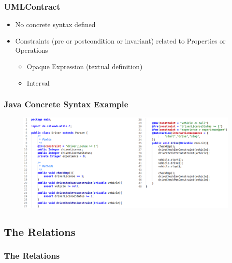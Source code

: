 \documentclass{beamer}
\begin{document}
\begin{frame}
	\frametitle{UMLContract}
	\begin{itemize}
		\item No concrete syntax defined
		\item Constraints (pre or postcondition or invariant) related to Properties or Operations
		\begin{itemize}
			\item Opaque Expression (textual definition)
			\item Interval
		\end{itemize}	
	\end{itemize}
\end{frame}

\begin{frame}
	\frametitle{Java Concrete Syntax Example}
	\nocite{heidenreich2009jamopp}
	\begin{figure}[h]
   		\includegraphics[width=330pt]{javaMetamodelExample01_Text}
	\end{figure}	
\end{frame}

\subsection{The Relations}
\begin{frame}
	\frametitle{The Relations}
\end{frame}
\end{document}
